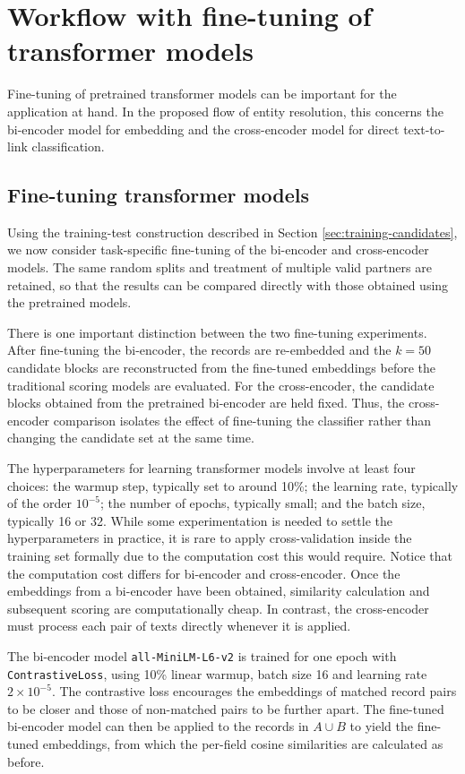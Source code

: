 \section{Workflow with fine-tuning of transformer models}
\label{sec:finetuning}

Fine-tuning of pretrained transformer models can be important for the application at hand.
In the proposed flow of entity resolution, this concerns the bi-encoder model for embedding
and the cross-encoder model for direct text-to-link classification.


\subsection{Fine-tuning transformer models}
\label{sec:fine-tuning-models}

Using the training-test construction described in Section
\ref{sec:training-candidates}, we now consider task-specific fine-tuning
of the bi-encoder and cross-encoder models. The same random splits and
treatment of multiple valid partners are retained, so that the results
can be compared directly with those obtained using the pretrained models.

There is one important distinction between the two fine-tuning
experiments. After fine-tuning the bi-encoder, the records are re-embedded
and the $k=50$ candidate blocks are reconstructed from the fine-tuned
embeddings before the traditional scoring models are evaluated. For the
cross-encoder, the candidate blocks obtained from the pretrained
bi-encoder are held fixed. Thus, the cross-encoder comparison isolates
the effect of fine-tuning the classifier rather than changing the
candidate set at the same time.

The hyperparameters for learning transformer models involve at least four choices: the
warmup step, typically set to around 10\%; the learning rate, typically of the order
$10^{-5}$; the number of epochs, typically small; and the batch size, typically 16 or 32.
While some experimentation is needed to settle the hyperparameters in practice, it is rare
to apply cross-validation inside the training set formally due to the computation cost this
would require. Notice that the computation cost differs for bi-encoder and cross-encoder.
Once the embeddings from a bi-encoder have been obtained, similarity calculation and
subsequent scoring are computationally cheap. In contrast, the cross-encoder must process
each pair of texts directly whenever it is applied.

The bi-encoder model \texttt{all-MiniLM-L6-v2} is trained for one epoch with
\texttt{ContrastiveLoss}, using 10\% linear warmup, batch size 16 and learning rate
$2\times10^{-5}$. The contrastive loss encourages the embeddings of matched record
pairs to be closer and those of non-matched pairs to be further apart. The fine-tuned
bi-encoder model can then be applied to the records in $A\cup B$ to yield the fine-tuned
embeddings, from which the per-field cosine similarities are calculated as before.

